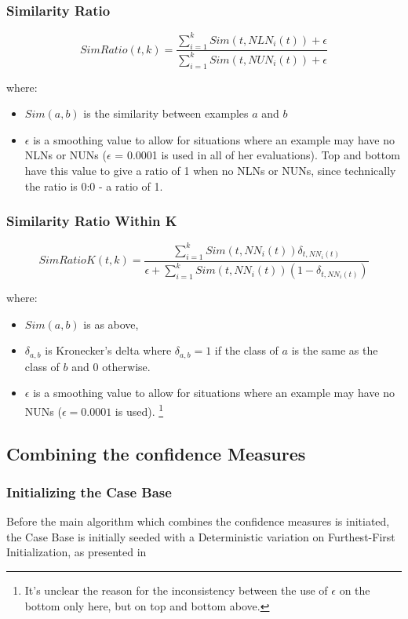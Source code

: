 \documentclass[a4paper,11pt]{report}
\begin{document}
\subsubsection{Similarity Ratio}
\[
SimRatio(t,k)=\frac{\sum_{i=1}^{k}Sim(t,NLN_{i}(t))+\epsilon}{\sum_{i=1}^{k}Sim(t,NUN_{i}(t))+\epsilon}
\]

where:
\begin{itemize}
	\item $Sim(a, b)$ is the similarity between examples $a$ and $b$ 
	\item $\epsilon$ is a smoothing value to allow for situations where an example may have no NLNs or NUNs ($\epsilon$ = 0.0001 is used in all of her evaluations). Top and bottom have this value to give a ratio of 1 when no NLNs or NUNs, since technically the ratio is 0:0 - a ratio of 1.
\end{itemize}

\subsubsection{Similarity Ratio Within K}
\[
SimRatioK(t,k)=\frac{\sum_{i=1}^{k}Sim(t,NN_{i}(t))\delta_{t,NN_{i}(t)}}{\epsilon+\sum_{i=1}^{k}Sim(t,NN_{i}(t))(1-\delta_{t,NN_{i}(t)})}
\]

where:
\begin{itemize}
	\item $Sim(a, b)$ is as above, 
	\item $\delta_{a, b}$ is Kronecker's delta where $\delta_{a, b}=1$ if the class of $a$ is the same as the class of $b$ and $0$ otherwise. 
	\item $\epsilon$ is a smoothing value to allow for situations where an example may have no NUNs ($\epsilon = 0.0001$ is used). \footnote{It's unclear the reason for the inconsistency between the use of $\epsilon$ on the bottom only here, but on top and bottom above.}
\end{itemize}


\subsection{Combining the confidence Measures}
\subsubsection{Initializing the Case Base}
Before the main algorithm which combines the confidence measures is initiated, the Case Base is initially seeded with a Deterministic variation on Furthest-First Initialization, as presented in \citet{Greene2007}
\end{document}
